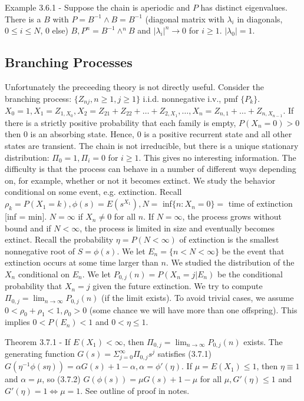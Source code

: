 \documentclass{article}
\begin{document}
Example 3.6.1 - Suppose the chain is aperiodic and $P$ has distinct eigenvalues. There is a $B$ with $P = B^{-1} \wedge B = B^{-1}$ (diagonal matrix with $\lambda_i$ in diagonals, $0 \le i \le N$, 0 else) $B, P^n = B^{-1} \wedge^n B$ and $|\lambda_i|^n \rightarrow 0$ for $i \ge 1$. $|\lambda_0| = 1$.

\subsection{Branching Processes}

Unfortunately the preceeding theory is not directly useful. Consider the branching process: $\{Z_{nj}, n \ge 1, j \ge 1\}$ i.i.d. nonnegative i.v., pmf $\{P_k\}$. $X_0 = 1, X_1 = Z_{1, X_0}, X_2 = Z_{21} + Z_{22} + \dots + Z_{2, X_1}, \dots, X_n = Z_{n, 1} + \dots + Z_{n, X_{n-1}}$. If there is a strictly positive probability that each family is empty, $P(X_n=0) > 0$ then 0 is an absorbing state. Hence, 0 is a positive recurrent state and all other states are transient. The chain is not irreducible, but there is a unique stationary distribution: $\Pi_0 = 1, \Pi_i = 0$ for $i \ge 1$. This gives no interesting information. The difficulty is that the process can behave in a number of different ways depending on, for example, whether or not it becomes extinct. We study the behavior conditional on some event, e.g. extinction. Recall $\rho_k = P(X_1=k), \phi(s) = E(s^{X_1}), N =$ inf$\{n: X_n = 0\} =$ time of extinction [inf = min]. $N = \infty$ if $X_n \ne 0$ for all $n$. If $N = \infty$, the process grows without bound and if $N < \infty$, the process is limited in size and eventually becomes extinct. Recall the probability $\eta = P(N < \infty)$ of extinction is the smallest nonnegative root of $S = \phi(s)$. We let $E_n = \{n < N < \infty \}$ be the event that extinction occurs at some time larger than $n$. We studied the distribution of the $X_n$ conditional on $E_n$. We let $P_{0, j}(n) = P(X_n = j|E_n)$ be the conditional probability that $X_n = j$ given the future extinction. We try to compute $\Pi_{0, j} = \lim_{n \rightarrow \infty} P_{0, j}(n)$ (if the limit exists). To avoid trivial cases, we assume $0 < \rho_0 + \rho_1 < 1, \rho_0 > 0$ (some chance we will have more than one offspring). This implies $0 < P(E_n) < 1$ and $ 0 < \eta \le 1$.

Theorem 3.7.1 - If $E(X_1) < \infty$, then $\Pi_{0, j} = \lim_{n \rightarrow \infty} P_{0, j}(n)$ exists. The generating function $G(s) = \Sigma_{j=0}^\infty \Pi_{0, j} s^j$ satisfies (3.7.1) $G(\eta^{-1} \phi(s\eta)) = \alpha G(s) + 1 - \alpha, \alpha = \phi'(\eta)$. If $\mu = E(X_1) \le 1$, then $\eta \equiv 1$ and $\alpha = \mu$, so (3.7.2) $G(\phi(s)) = \mu G(s) + 1 - \mu$ for all $\mu, G'(\eta) \le 1$ and $G'(\eta) = 1 \iff \mu = 1$. See outline of proof in notes.
\end{document}
